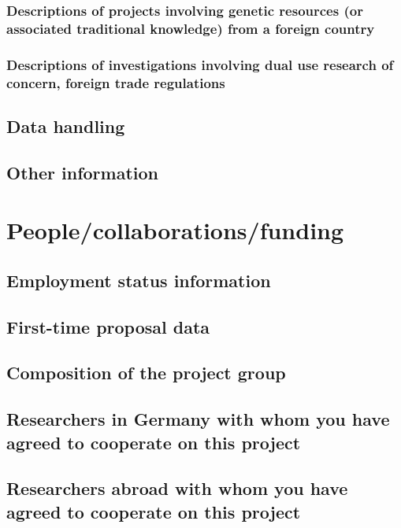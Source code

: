 \documentclass{scrartcl}
\begin{document}
\subsubsection{Descriptions of projects involving genetic resources (or associated traditional knowledge) from a foreign country}

\subsubsection{Descriptions of investigations involving dual use research of concern, foreign trade regulations}

\subsection{Data handling}

\subsection{Other information}


\section{People/collaborations/funding}

\subsection{Employment status information}

\subsection{First-time proposal data}

\subsection{Composition of the project group}

\subsection{Researchers in Germany with whom you have agreed to cooperate on this project}

\subsection{Researchers abroad with whom you have agreed to cooperate on this project}
\end{document}
